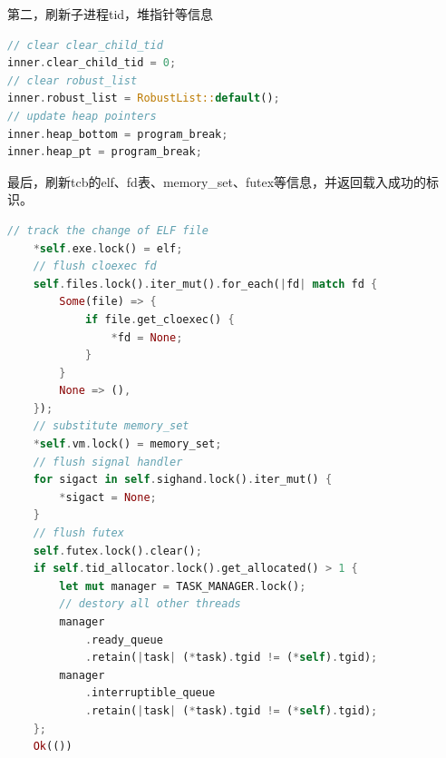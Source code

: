第二，刷新子进程tid，堆指针等信息

\begin{lstlisting}[language={Rust}, 
    caption={load_elf信息覆写-2}]
// clear clear_child_tid
inner.clear_child_tid = 0;
// clear robust_list
inner.robust_list = RobustList::default();
// update heap pointers
inner.heap_bottom = program_break;
inner.heap_pt = program_break;
\end{lstlisting}

最后，刷新tcb的elf、fd表、memory_set、futex等信息，并返回载入成功的标识。

\begin{lstlisting}[language={Rust}, 
    caption={load_elf信息覆写-3}]
// track the change of ELF file
    *self.exe.lock() = elf;
    // flush cloexec fd
    self.files.lock().iter_mut().for_each(|fd| match fd {
        Some(file) => {
            if file.get_cloexec() {
                *fd = None;
            }
        }
        None => (),
    });
    // substitute memory_set
    *self.vm.lock() = memory_set;
    // flush signal handler
    for sigact in self.sighand.lock().iter_mut() {
        *sigact = None;
    }
    // flush futex
    self.futex.lock().clear();
    if self.tid_allocator.lock().get_allocated() > 1 {
        let mut manager = TASK_MANAGER.lock();
        // destory all other threads
        manager
            .ready_queue
            .retain(|task| (*task).tgid != (*self).tgid);
        manager
            .interruptible_queue
            .retain(|task| (*task).tgid != (*self).tgid);
    };
    Ok(())
\end{lstlisting}